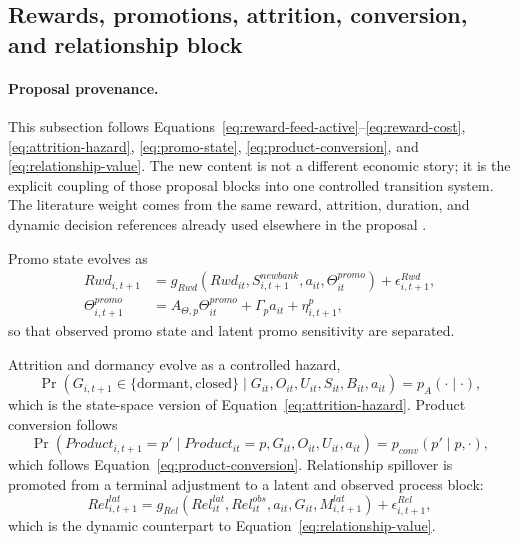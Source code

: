 \documentclass[11pt]{article}
\newcommand{\1}{\mathbf{1}}
\begin{document}
\subsection{Rewards, promotions, attrition, conversion, and relationship block}
\label{subsec:state-space-promo-attrition}

\paragraph{Proposal provenance.}
This subsection follows Equations~\eqref{eq:reward-feed-active}--\eqref{eq:reward-cost},
\eqref{eq:attrition-hazard}, \eqref{eq:promo-state},
\eqref{eq:product-conversion}, and \eqref{eq:relationship-value}. The new
content is not a different economic story; it is the explicit coupling of those
proposal blocks into one controlled transition system. The literature weight
comes from the same reward, attrition, duration, and dynamic decision references
already used elsewhere in the proposal
\citep{agarwal2010rewards,schmittlein1987counting,fader2005bgnbd,
bolton1998duration,puterman1994mdp,murphy2003dynamic}.

Promo state evolves as
\begin{align}
  Rwd_{i,t+1}
    &= g_{Rwd}(Rwd_{it},S^{newbank}_{i,t+1},a_{it},\Theta^{promo}_{it})
       + \epsilon^{Rwd}_{i,t+1},
       \label{eq:ss-reward-transition}\\
  \Theta^{promo}_{i,t+1}
    &= A_{\Theta,p}\Theta^{promo}_{it} + \Gamma_p a_{it} + \eta^p_{i,t+1},
       \label{eq:ss-promo-latent}
\end{align}
so that observed promo state and latent promo sensitivity are separated.

Attrition and dormancy evolve as a controlled hazard,
\begin{equation}
  \Pr(G_{i,t+1}\in\{\mathrm{dormant},\mathrm{closed}\}
  \mid G_{it},O_{it},U_{it},S_{it},B_{it},a_{it})
  = p_A(\cdot\mid\cdot),
  \label{eq:ss-attrition-transition}
\end{equation}
which is the state-space version of Equation~\eqref{eq:attrition-hazard}.
Product conversion follows
\begin{equation}
  \Pr(Product_{i,t+1}=p'\mid Product_{it}=p,G_{it},O_{it},U_{it},a_{it})
  = p_{conv}(p'\mid p,\cdot),
  \label{eq:ss-conversion-transition}
\end{equation}
which follows Equation~\eqref{eq:product-conversion}. Relationship spillover is
promoted from a terminal adjustment to a latent and observed process block:
\begin{equation}
  Rel^{lat}_{i,t+1}
  =
  g_{Rel}(Rel^{lat}_{it},Rel^{obs}_{it},a_{it},G_{it},M^{lat}_{i,t+1})
  + \epsilon^{Rel}_{i,t+1},
  \label{eq:ss-relationship-transition}
\end{equation}
which is the dynamic counterpart to Equation~\eqref{eq:relationship-value}.
\end{document}
